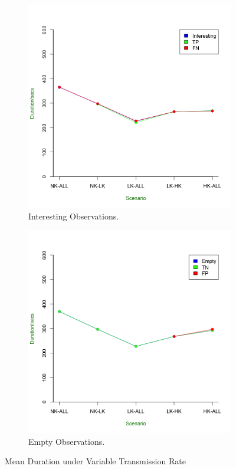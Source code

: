 \begin{figure}[h]
\centering
    \begin{subfigure}{.5\textwidth}
	\includegraphics[width=\textwidth]{Chap7/figures/real_int_dur}
	\caption{Interesting Observations.}
	\label{fig:real:int:dur}
	\end{subfigure}	

	\begin{subfigure}{.5\textwidth}
	\includegraphics[width=\textwidth]{Chap7/figures/real_empty_dur}
	\caption{Empty Observations.}
	\label{fig:real:empty:dur}
	\end{subfigure}	
	\caption{Mean Duration under Variable Transmission Rate}
\end{figure}

